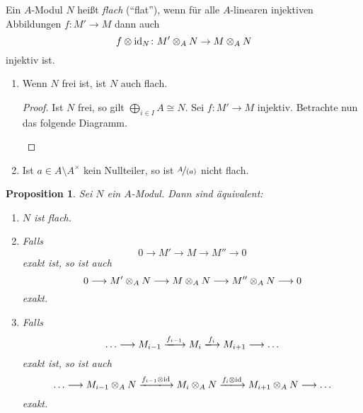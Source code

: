 \documentclass[12pt,a4paper]{scrartcl}
\theoremstyle{cplain}
\newtheorem{prop}[thmcounter]{Proposition}
\theoremstyle{cdef}
\begin{document}
\begin{defi}
	Ein $A$-Modul $N$ heißt \emph{flach} (\enquote{flat}), wenn für alle $A$-linearen injektiven Abbildungen $f: M' \to M$ dann auch \[ f \otimes \operatorname{id}_N \colon M' \otimes_A N \to M \otimes_A N \] injektiv ist.
\end{defi}
\begin{bsp}
	\leavevmode
	\begin{enumerate}
		\item Wenn $N$ frei ist, ist $N$ auch flach.
		\begin{proof}
			Ist $N$ frei, so gilt $\bigoplus_{i \in I} A \cong N$. Sei $f\colon M' \to M$ injektiv. Betrachte nun das folgende Diagramm.
			\begin{center}
			\end{center}
		\end{proof}
		\item Ist $a \in A \setminus A^{\times}$ kein Nullteiler, so ist $\nicefrac{A}{(a)}$ nicht flach.
	\end{enumerate}
\end{bsp}
\begin{prop}
	Sei $N$ ein $A$-Modul. Dann sind äquivalent:
	\begin{enumerate}
		\item $N$ ist flach. \label{prop:flach:i}
		\item Falls \[ 0 \longrightarrow M' \longrightarrow M \longrightarrow M'' \longrightarrow 0 \] exakt ist, so ist auch \[ 0 \longrightarrow M' \otimes_A N \longrightarrow M \otimes_A N \longrightarrow M'' \otimes_A N \longrightarrow 0 \] exakt. \label{prop:flach:ii}
		\item Falls \[ \ldots \longrightarrow M_{i-1} \xlongrightarrow{f_{i-1}} M_i \xlongrightarrow{f_{i}} M_{i+1} \longrightarrow \ldots \] exakt ist, so ist auch \[ \ldots \longrightarrow M_{i-1}\tp_A N \xlongrightarrow{f_{i-1}\tp\id} M_i\tp_A N \xlongrightarrow{f_{i}\tp\id} M_{i+1}\tp_A N \longrightarrow \ldots \] exakt. \label{prop:flach:iii}
	\end{enumerate}
\end{prop}
\end{document}
